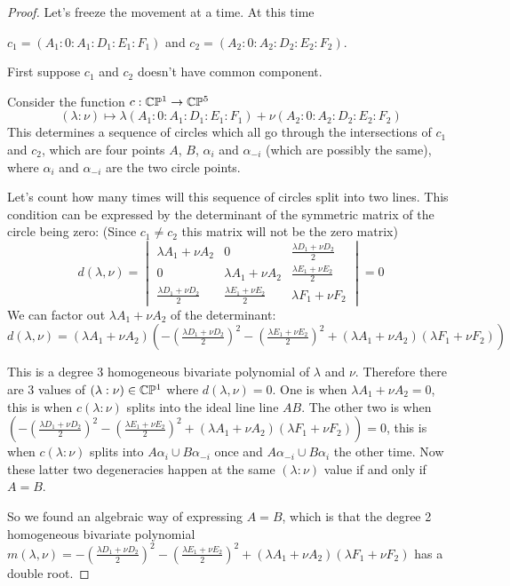\documentclass[a4paper]{article}
\begin{document}
\begin{proof}
    Let's freeze the movement at a time. At this time

    $c_1=(A_1:0:A_1:D_1:E_1:F_1)$ and $c_2=(A_2:0:A_2:D_2:E_2:F_2)$.

    First suppose $c_1$ and $c_2$ doesn't have common component.

    Consider the function $c:\mathbb{C}\mathbb{P}^1\to \mathbb{C}\mathbb{P}^5$
    $$(\lambda:\nu) \mapsto \lambda(A_1:0:A_1:D_1:E_1:F_1)+\nu(A_2:0:A_2:D_2:E_2:F_2)$$
    This determines a sequence of circles which all go through the intersections of $c_1$ and $c_2$, which are four points $A$, $B$, $\alpha_i$ and $\alpha_{-i}$ (which are possibly the same), where $\alpha_i$ and $\alpha_{-i}$ are the two circle points.

    Let's count how many times will this sequence of circles split into two lines. This condition can be expressed by the determinant of the symmetric matrix of the circle being zero: (Since $c_1\ne c_2$ this matrix will not be the zero matrix)
    $$
    d(\lambda,\nu)=
    \begin{vmatrix}
    \lambda A_1+\nu A_2 & 0 & \tfrac{\lambda D_1+\nu D_2}{2}\\[4pt]
    0 & \lambda A_1+\nu A_2 & \tfrac{\lambda E_1+\nu E_2}{2}\\[4pt]
    \tfrac{\lambda D_1+\nu D_2}{2} & \tfrac{\lambda E_1+\nu E_2}{2} & \lambda F_1+\nu F_2
    \end{vmatrix}=0
    $$
    We can factor out $\lambda A_1+\nu A_2$ of the determinant:
    $$d(\lambda,\nu)=(\lambda A_1+\nu A_2)\left(-\left(\tfrac{\lambda D_1+\nu D_2}{2}\right)^2-\left(\tfrac{\lambda E_1+\nu E_2}{2}\right)^2+(\lambda A_1+\nu A_2)(\lambda F_1+\nu F_2)\right)$$


This is a degree 3 homogeneous bivariate polynomial of $\lambda$ and $\nu$. Therefore there are 3 values of $(\lambda:\nu)\in \mathbb{C}\mathbb{P}^1$ where $d(\lambda,\nu)=0$. One is when $\lambda A_1+\nu A_2=0$, this is when $c(\lambda:\nu)$ splits into the ideal line line $AB$. The other two is when $\left(-\left(\tfrac{\lambda D_1+\nu D_2}{2}\right)^2-\left(\tfrac{\lambda E_1+\nu E_2}{2}\right)^2+(\lambda A_1+\nu A_2)(\lambda F_1+\nu F_2)\right)=0$, this is when $c(\lambda:\nu)$ splits into $A\alpha_i\cup B\alpha_{-i}$ once and $A\alpha_{-i}\cup B\alpha_i$ the other time. Now these latter two degeneracies happen at the same $(\lambda:\nu)$ value if and only if $A=B$.

So we found an algebraic way of expressing $A=B$, which is that the degree 2 homogeneous bivariate polynomial $m(\lambda,\nu)=-\left(\tfrac{\lambda D_1+\nu D_2}{2}\right)^2-\left(\tfrac{\lambda E_1+\nu E_2}{2}\right)^2+(\lambda A_1+\nu A_2)(\lambda F_1+\nu F_2)$ has a double root.


\end{proof}
\end{document}
